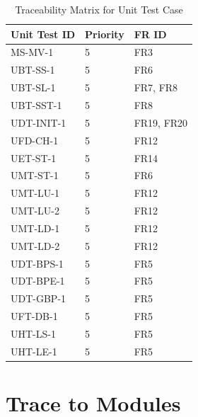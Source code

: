 \documentclass[12pt, titlepage]{article}
\begin{document}
\begin{table}[ht]
\begin{tabular}{|p{3cm}|p{3cm}|p{7cm}|}
 \hline
 Unit Test ID & Priority & FR ID\\ 
 \hline
 MS-MV-1 & 5 & FR3\\ 
 \hline
 UBT-SS-1 & 5 & FR6\\ 
 \hline
 UBT-SL-1 & 5 & FR7, FR8\\
 \hline
 UBT-SST-1 & 5 & FR8\\
 \hline
 UDT-INIT-1 & 5 & FR19, FR20\\
  \hline
 UFD-CH-1 & 5 & FR12\\
  \hline
 UET-ST-1 & 5 & FR14\\
  \hline
 UMT-ST-1 & 5 & FR6\\
  \hline
 UMT-LU-1 & 5 & FR12\\
  \hline
 UMT-LU-2 & 5 & FR12\\
  \hline
 UMT-LD-1 & 5 & FR12\\
  \hline
 UMT-LD-2 & 5 & FR12\\
  \hline
 UDT-BPS-1 & 5 & FR5\\
  \hline
 UDT-BPE-1 & 5 & FR5\\
  \hline
 UDT-GBP-1 & 5 & FR5\\
  \hline
 UFT-DB-1 & 5 & FR5\\
  \hline
 UHT-LS-1 & 5 & FR5\\
  \hline
 UHT-LE-1 & 5 & FR5\\
  \hline
 
 
\end{tabular}
\caption{Traceability Matrix for Unit Test Case}
\label{table: Traceability Matrix for Unit Test Cases}
\end{table}





\section{Trace to Modules}		
\end{document}

